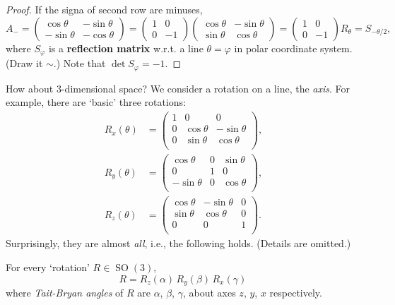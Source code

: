 \begin{prop}
\begin{proof}
If the signa of second row are minuses, $$A_- = \begin{pmatrix}\cos \theta &-\sin \theta \\-\sin \theta & -\cos \theta \end{pmatrix}  = \begin{pmatrix}1&0\\0&-1\end{pmatrix} \begin{pmatrix}\cos \theta &-\sin \theta \\\sin \theta & \cos \theta \end{pmatrix} =\begin{pmatrix}1&0\\0&-1\end{pmatrix} R_\theta = S_{-\theta/2},$$ where $S_\varphi$ is a \textbf{reflection matrix} w.r.t. a line $\theta = \varphi$ in polar coordinate system. (Draw it $\sim \!.$) Note that $\operatorname{det}S_\varphi = -1$.
\end{proof}
\end{prop}

How about 3-dimensional space? We consider a rotation on a line, the \textit{axis}. For example, there are `basic' three rotations: $$\displaystyle {\begin{alignedat}{1}R_{x}(\theta )&={\begin{pmatrix}1&0&0\\0&\cos \theta &-\sin \theta \\[3pt]0&\sin \theta &\cos \theta \\[3pt]\end{pmatrix},}\\[6pt]R_{y}(\theta )&={\begin{pmatrix}\cos \theta &0&\sin \theta \\[3pt]0&1&0\\[3pt]-\sin \theta &0&\cos \theta \\\end{pmatrix},}\\[6pt]R_{z}(\theta )&={\begin{pmatrix}\cos \theta &-\sin \theta &0\\[3pt]\sin \theta &\cos \theta &0\\[3pt]0&0&1\\\end{pmatrix}.}\end{alignedat}}$$ Surprisingly, they are almost \textit{all}, i.e., the following holds. (Details are omitted.)

\begin{theorem}
For every `rotation' $R\in\operatorname{SO}(3)$,
$$R=R_{z}(\alpha )\,R_{y}(\beta )\,R_{x}(\gamma )\,$$
 where \textit{Tait-Bryan angles} of $R$ are $\alpha$, $\beta$, $\gamma$, about axes $z$, $y$, $x$ respectively.
\end{theorem}

